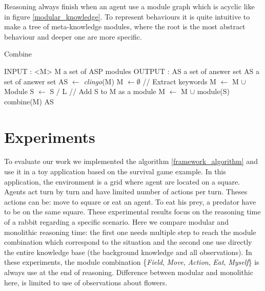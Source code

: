 \documentclass{aamas2012}
\begin{document}
	Reasoning always finish when an agent use a module graph which is acyclic like in figure \ref{modular_knowledge}.
	To represent behaviours it is quite intuitive to make a tree of meta-knowledge modules, 
	where the root is the most abstract behaviour and deeper one are more specific.

	\begin{algorithm}
	\caption{Combine}
	\label{framework_algorithm}
	\begin{algorithmic}[1]
	\STATE INPUT : <M> M a set of ASP modules
	\STATE OUTPUT : AS a set of answer set
	\newline
	\STATE AS a set of answer set
	\newline
	\STATE AS $\leftarrow$ \textit{clingo}(M)
	\newline
		\STATE M $\leftarrow \emptyset$ 
		\newline
		\STATE // Extract keywords
				\STATE M $\leftarrow$ M $\cup$ Module
				\STATE S $\leftarrow$ S $/$ L
			\ENDIF
		\ENDFOR
		\newline
			\STATE // Add S to M as a module
			\STATE M $\leftarrow$ M $\cup$ module(S)
			\STATE combine(M)
		\ENDIF
	\ENDFOR
	\newline
	\RETURN AS
	\end{algorithmic}
	\end{algorithm}

\section{Experiments}

	To evaluate our work we implemented the algorithm \ref{framework_algorithm} and use it in a toy application based on the survival game example.
	In this application, the environment is a grid where agent are located on a square.
	Agents act turn by turn and have limited number of actions per turn.
	Theses actions can be: move to square or eat an agent.
	To eat his prey, a predator have to be on the same square.
	These experimental results focus on the reasoning time of a rabbit regarding a specific scenario.
	Here we compare modular and monolithic reasoning time: the first one needs multiple step to reach the module combination
	which correspond to the situation and the second one use directly the entire knowledge base (the background knowledge and all observations).
	In these experiments, the module combination \{\emph{Field}, \emph{Move}, \emph{Action}, \emph{Eat}, \emph{Myself}\} is always use at the end of reasoning.
	Difference between modular and monolithic here, is limited to use of observations about flowers.
	
\end{document}
